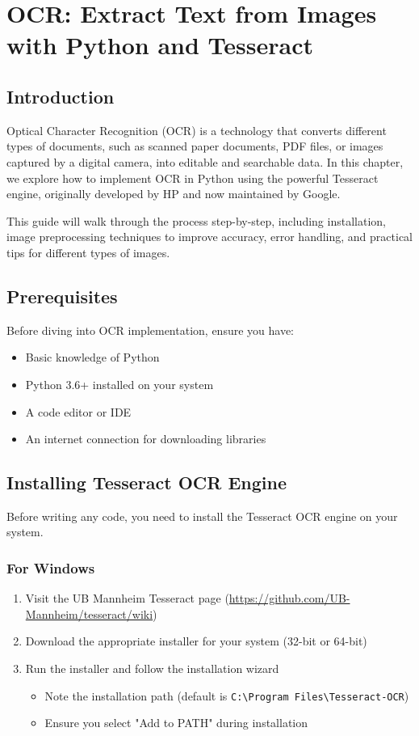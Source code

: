 \chapter{OCR: Extract Text from Images with Python and Tesseract}

\section{Introduction}
Optical Character Recognition (OCR) is a technology that converts different types of documents, such as scanned paper documents, PDF files, or images captured by a digital camera, into editable and searchable data. In this chapter, we explore how to implement OCR in Python using the powerful Tesseract engine, originally developed by HP and now maintained by Google.

This guide will walk through the process step-by-step, including installation, image preprocessing techniques to improve accuracy, error handling, and practical tips for different types of images.

\section{Prerequisites}
Before diving into OCR implementation, ensure you have:
\begin{itemize}
	\item Basic knowledge of Python
	\item Python 3.6+ installed on your system
	\item A code editor or IDE
	\item An internet connection for downloading libraries
\end{itemize}

\section{Installing Tesseract OCR Engine}
Before writing any code, you need to install the Tesseract OCR engine on your system.

\subsection{For Windows}
\begin{enumerate}
	\item Visit the UB Mannheim Tesseract page (\url{https://github.com/UB-Mannheim/tesseract/wiki})
	\item Download the appropriate installer for your system (32-bit or 64-bit)
	\item Run the installer and follow the installation wizard
	\begin{itemize}
		\item Note the installation path (default is \texttt{C:\textbackslash Program Files\textbackslash Tesseract-OCR})
		\item Ensure you select "Add to PATH" during installation
	\end{itemize}
\end{enumerate}

